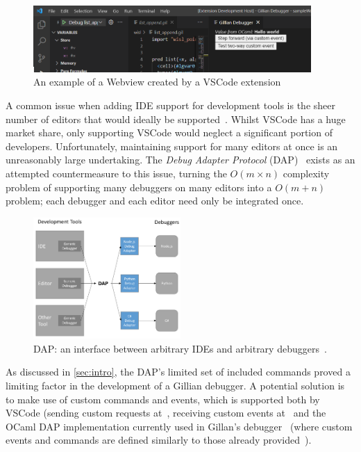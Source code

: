 \begin{figure}
  \center
  \includegraphics[width=400px]{img/webview-example.png}
  \caption{An example of a Webview created by a VSCode extension}
  \label{fig:webview-example}
\end{figure}


A common issue when adding IDE support for development tools is the sheer
number of editors that would ideally be supported~\cite{magpiebridge}. Whilst
VSCode has a huge market share, only supporting VSCode would neglect a
significant portion of developers. Unfortunately, maintaining support for many
editors at once is an unreasonably large undertaking. The \textit{Debug Adapter
Protocol} (DAP)~\cite{dap} exists as an attempted countermeasure to this issue,
turning the $O(m \times n)$ complexity problem of supporting many debuggers on
many editors into a $O(m + n)$ problem; each debugger and each editor need only
be integrated once.

\begin{figure}[!t]
  \centering
  \includegraphics[width=0.5\textwidth]{img/dap-diagram.png}
  \caption{
    DAP: an interface between arbitrary IDEs and
    arbitrary debuggers~\cite{dap}.
  }
  \label{fig:dap-diagram}
\end{figure}

As discussed in \autoref{sec:intro}, the DAP's limited set of
included commands proved a limiting factor in the development of a Gillian
debugger. A potential solution is to make use of custom commands and events,
which is supported both by VSCode (sending custom requests
at~\cite{vscode-dap-custom-request}, receiving custom events
at~\cite{vscode-dap-custom-event} and the OCaml DAP
implementation currently used in Gillan's debugger~\cite{ocaml-dap} (where
custom events and commands are defined similarly to those already
provided~\cite{ocaml-dap-custom}).


